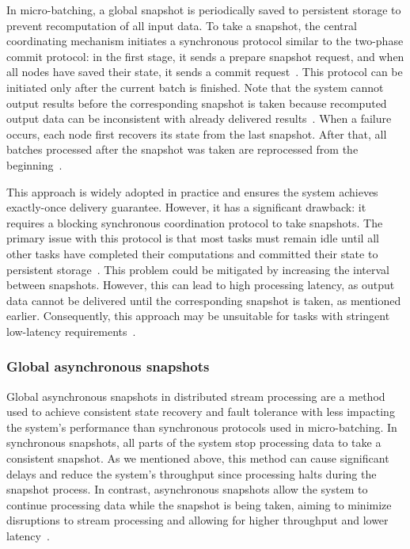 In micro-batching, a global snapshot is periodically saved to persistent storage to prevent recomputation of all input data. To take a snapshot, the central coordinating mechanism initiates a synchronous protocol similar to the two-phase commit protocol: in the first stage, it sends a prepare snapshot request, and when all nodes have saved their state, it sends a commit request~\cite{carbone2018scalable}. This protocol can be initiated only after the current batch is finished. Note that the system cannot output results before the corresponding snapshot is taken because recomputed output data can be inconsistent with already delivered results~\cite{carbone2018scalable, thepaper}. When a failure occurs, each node first recovers its state from the last snapshot. After that, all batches processed after the snapshot was taken are reprocessed from the beginning~\cite{Zaharia:2012:DSE:2342763.2342773}.

This approach is widely adopted in practice and ensures the system achieves exactly-once delivery guarantee. However, it has a significant drawback: it requires a blocking synchronous coordination protocol to take snapshots. The primary issue with this protocol is that most tasks must remain idle until all other tasks have completed their computations and committed their state to persistent storage~\cite{carbone2018scalable, thepaper}. This problem could be mitigated by increasing the interval between snapshots. However, this can lead to high processing latency, as output data cannot be delivered until the corresponding snapshot is taken, as mentioned earlier. Consequently, this approach may be unsuitable for tasks with stringent low-latency requirements~\cite{carbone2018scalable}.

\subsubsection{Global asynchronous snapshots}

Global asynchronous snapshots in distributed stream processing are a method used to achieve consistent state recovery and fault tolerance with less impacting the system's performance than synchronous protocols used in micro-batching. In synchronous snapshots, all parts of the system stop processing data to take a consistent snapshot. As we mentioned above, this method can cause significant delays and reduce the system's throughput since processing halts during the snapshot process. In contrast, asynchronous snapshots allow the system to continue processing data while the snapshot is being taken, aiming to minimize disruptions to stream processing and allowing for higher throughput and lower latency~\cite{2015arXiv150608603C, Carbone:2017:SMA:3137765.3137777}.

